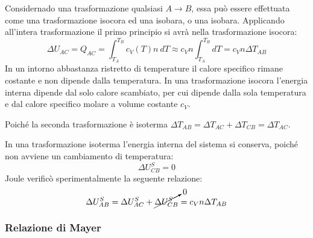 \documentclass{article}
\numberwithin{equation}{subsection}
\begin{document}
Considernado una trasformazione qualsiasi $A\to B$, essa può essere 
effettuata come una trasformazione isocora ed una isobara, 
o una isobara. Applicando all'intera trasformazione il primo 
principio si avrà nella trasformazione isocora:
\begin{equation*}
    \Delta U_{AC}=Q_{AC}=\int_{T_A}^{T_B}c_V(T)n\:dT\approx c_Vn\int_{T_A}^{T_B}dT=c_Vn\Delta T_{AB}
\end{equation*}
In un intorno abbastanza ristretto di temperature il calore specifico rimane costante e non dipende dalla temperatura. In una trasformazione isocora l'energia interna 
dipende dal solo calore scambiato, per cui dipende dalla sola temperatura e dal calore specifico molare a volume costante $c_V$. 


Poiché la seconda trasformazione 
è isoterma $\Delta T_{AB}=\Delta T_{AC}+\Delta T_{CB}=\Delta T_{AC}$. 



In una trasformazione isoterma l'energia interna del sistema 
si conserva, poiché non avviene un cambiamento di temperatura: 
\begin{equation*}
    \Delta U_{CB}^S=0
\end{equation*}
Joule verificò sperimentalmente la seguente relazione: 
\begin{equation}
    \Delta U^S_{AB}=\Delta U^S_{AC}+\cancelto{0}{\Delta U^S_{CB}}=c_Vn\Delta T_{AB}
\end{equation}


\begin{center}\end{center}

\subsubsection{Relazione di Mayer}
\end{document}
